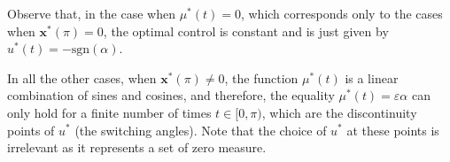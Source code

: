 \documentclass[9pt,shortpaper,twoside,web]{ieeecolor}
\begin{document}
%	

Observe that, in the case when $\mu^\ast(t) = 0$, which corresponds only to the cases when $\bm{x}^\ast(\pi) = 0$, the optimal control is constant and is just given by  $u^\ast (t) =  -\text{sgn} (\alpha)$.

In all the other cases, when $\bm{x}^\ast(\pi)\neq 0$, the function $\mu^\ast(t)$ is a linear combination of sines and cosines, and therefore, the equality $\mu^\ast (t) = \varepsilon\alpha$ can only hold for a finite number of times $t\in [0,\pi)$, which are the discontinuity points of $u^\ast$ (the switching angles). Note that the choice of $u^\ast$ at these points is irrelevant as it represents a set of zero measure.
\end{document}
